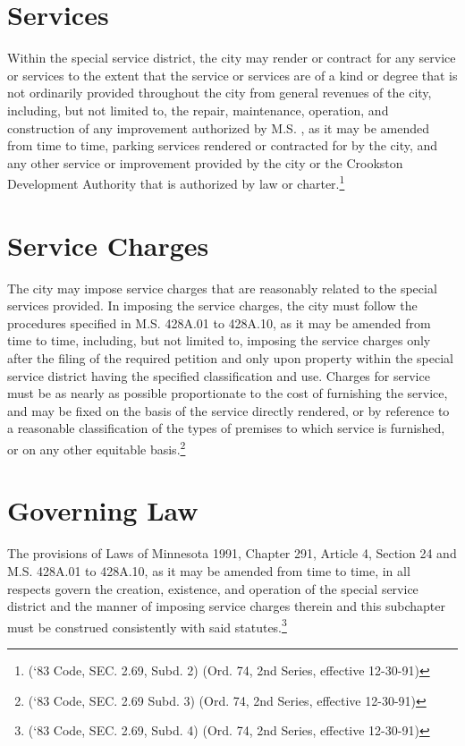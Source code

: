 \section{Services}
Within the special service district, the city may render or contract for any service or services to the extent that the service or services are of a kind or degree that is not ordinarily provided throughout the city from general revenues of the city, including, but not limited to, the repair, maintenance, operation, and construction of any improvement authorized by M.S. , as it may be amended from time to time, parking services rendered or contracted for by the city, and any other service or improvement provided by the city or the Crookston Development Authority that is authorized by law or charter.\footnote{(‘83 Code, SEC. 2.69, Subd. 2)  (Ord. 74, 2nd Series, effective 12-30-91)}
\section{Service Charges}
The city may impose service charges that are reasonably related to the special services provided.  In imposing the service charges, the city must follow the procedures specified in M.S. \textsection 428A.01 to \textsection 428A.10, as it may be amended from time to time, including, but not limited to, imposing the service charges only after the filing of the required petition and only upon property within the special service district having the specified classification and use.  Charges for service must be as nearly as possible proportionate to the cost of furnishing the service, and may be fixed on the basis of the service directly rendered, or by reference to a reasonable classification of the types of premises to which service is furnished, or on any other equitable basis.\footnote{(‘83 Code, SEC. 2.69 Subd. 3)  (Ord. 74, 2nd Series, effective 12-30-91)}
\section{Governing Law}
The provisions of Laws of Minnesota 1991, Chapter 291, Article 4, Section 24 and M.S. \textsection 428A.01 to \textsection 428A.10, as it may be amended from time to time, in all respects govern the creation, existence, and operation of the special service district and the manner of imposing service charges therein and this subchapter must be construed consistently with said statutes.\footnote{(‘83 Code, SEC. 2.69, Subd. 4)  (Ord. 74, 2nd Series, effective 12-30-91)}\\

